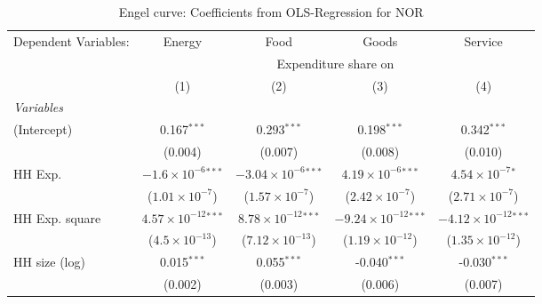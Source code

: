 
\begin{table}[htbp!]
   \centering
   \small
   \begin{adjustbox}{width = 1\textwidth, max height = 0.95\textheight, center}
      \begin{threeparttable}[b]
         \caption{\label{tab:Engel_parametric_NOR} Engel curve: Coefficients from OLS-Regression for NOR}
         \begin{tabular}{lcccc}
            \tabularnewline \midrule \midrule
            Dependent Variables: & Energy                         & Food                           & Goods                           & Service\\  
             & \multicolumn{4}{c}{Expenditure share on} \\ 
                                 & (1)                            & (2)                            & (3)                             & (4)\\  
            \midrule
            \emph{Variables}\\
            (Intercept)          & 0.167$^{***}$                  & 0.293$^{***}$                  & 0.198$^{***}$                   & 0.342$^{***}$\\   
                                 & (0.004)                        & (0.007)                        & (0.008)                         & (0.010)\\   
            HH Exp.              & $-1.6\times 10^{-6}$$^{***}$   & $-3.04\times 10^{-6}$$^{***}$  & $4.19\times 10^{-6}$$^{***}$    & $4.54\times 10^{-7}$$^{*}$\\    
                                 & ($1.01\times 10^{-7}$)         & ($1.57\times 10^{-7}$)         & ($2.42\times 10^{-7}$)          & ($2.71\times 10^{-7}$)\\    
            HH Exp. square       & $4.57\times 10^{-12}$$^{***}$  & $8.78\times 10^{-12}$$^{***}$  & $-9.24\times 10^{-12}$$^{***}$  & $-4.12\times 10^{-12}$$^{***}$\\    
                                 & ($4.5\times 10^{-13}$)         & ($7.12\times 10^{-13}$)        & ($1.19\times 10^{-12}$)         & ($1.35\times 10^{-12}$)\\    
            HH size (log)        & 0.015$^{***}$                  & 0.055$^{***}$                  & -0.040$^{***}$                  & -0.030$^{***}$\\   
                                 & (0.002)                        & (0.003)                        & (0.006)                         & (0.007)\\   

\end{tabular}
\end{threeparttable}
\end{adjustbox}
\end{table}
